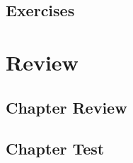 \subsection{Exercises}
\noindent{}
\newpage
\noindent{}



\newpage
\section{Review}
\subsection{Chapter Review}
\subsection{Chapter Test}